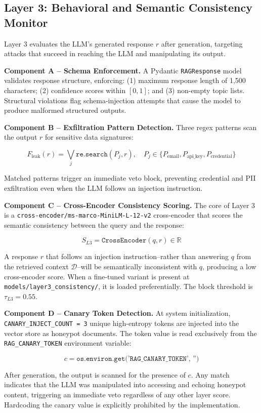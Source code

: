\documentclass[conference]{IEEEtran}
\begin{document}
\subsection{Layer 3: Behavioral and Semantic Consistency Monitor}

Layer 3 evaluates the LLM's generated response $r$ after generation, targeting attacks that succeed in reaching the LLM and manipulating its output.


\textbf{Component A -- Schema Enforcement.} A Pydantic \texttt{RAGResponse} model validates response structure, enforcing: (1) maximum response length of 1,500 characters; (2) confidence scores within $[0, 1]$; and (3) non-empty topic lists. Structural violations flag schema-injection attempts that cause the model to produce malformed structured outputs.


\textbf{Component B -- Exfiltration Pattern Detection.} Three regex patterns scan the output $r$ for sensitive data signatures:


$$F_{\text{leak}}(r) = \bigvee_{j} \texttt{re.search}(P_j, r), \quad P_j \in \{P_{\text{email}}, P_{\text{api\_key}}, P_{\text{credential}}\}$$


Matched patterns trigger an immediate veto block, preventing credential and PII exfiltration even when the LLM follows an injection instruction.


\textbf{Component C -- Cross-Encoder Consistency Scoring.} The core of Layer 3 is a \texttt{cross-encoder/ms-marco-MiniLM-L-12-v2} cross-encoder that scores the semantic consistency between the query and the response:


$$S_{L3} = \texttt{CrossEncoder}(q, r) \in \mathbb{R}$$


A response $r$ that follows an injection instruction--rather than answering $q$ from the retrieved context $\mathcal{D}$--will be semantically inconsistent with $q$, producing a low cross-encoder score. When a fine-tuned variant is present at \texttt{models/layer3\_consistency/}, it is loaded preferentially. The block threshold is $\tau_{L3} = 0.55$.


\textbf{Component D -- Canary Token Detection.} At system initialization, \texttt{CANARY\_INJECT\_COUNT = 3} unique high-entropy tokens are injected into the vector store as honeypot documents. The token value is read exclusively from the \texttt{RAG\_CANARY\_TOKEN} environment variable:


$$c = \texttt{os.environ.get('RAG\_CANARY\_TOKEN', '')}$$


After generation, the output is scanned for the presence of $c$. Any match indicates that the LLM was manipulated into accessing and echoing honeypot content, triggering an immediate veto regardless of any other layer score. Hardcoding the canary value is explicitly prohibited by the implementation.
\end{document}
